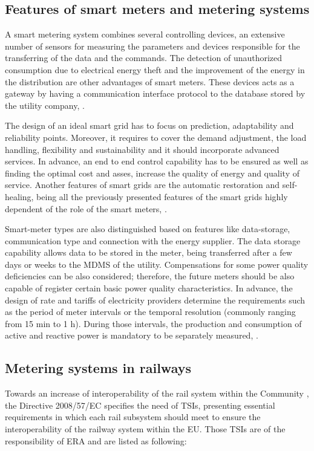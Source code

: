 \subsection{Features of smart meters and metering systems}

A smart metering system combines several controlling devices, an extensive number of sensors for measuring the parameters and devices responsible for the transferring of the data and the commands. The detection of unauthorized consumption due to electrical energy theft and the improvement of the energy in the distribution are other advantages of smart meters. These devices acts as a gateway by having a communication interface protocol to the database stored by the utility company, \cite{Reddy2014}.

The design of an ideal smart grid has to focus on prediction, adaptability and reliability points. Moreover, it requires to cover the demand adjustment, the load handling, flexibility and sustainability and it should incorporate advanced services. In advance, an end to end control capability has to be ensured as well as finding the optimal cost and asses, increase the quality of energy and quality of service. Another features of smart grids are the automatic restoration and self-healing, being all the previously presented features of the smart grids highly dependent of the role of the smart meters, \cite{Mohassel2014}.

Smart-meter types are also distinguished based on features like data-storage, communication type and connection with the energy supplier. The data storage capability allows data to be stored in the meter, being transferred after a few days or weeks to the \ac{MDMS} of the utility. Compensations for some power quality deficiencies can be also considered; therefore, the future meters should be also capable of register certain basic power quality characteristics. In advance, the design of rate and tariffs of electricity providers determine the requirements such as the period of meter intervals or the temporal resolution (commonly ranging from 15 min to 1 h). During those intervals, the production and consumption of active and reactive power is mandatory to be separately measured, \cite{Siano2014}.

\subsection{Metering systems in railways}

Towards an increase of interoperability of the rail system within the Community \cite{eur-lex2008}, the Directive 2008/57/EC specifies the need of  \ac{TSIs}, presenting essential requirements in which each rail subsystem should meet to ensure the interoperability of the railway system within the \ac{EU}. Those \ac{TSIs} are of the responsibility of \ac{ERA} and are listed as following:

